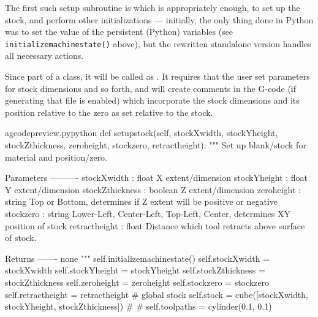 \documentclass{ltxdoc}
\begin{document}
The first such setup subroutine is   which is appropriately enough, to set up the stock, and perform other initializations --- initially, the only thing done in Python was to set the value of the persistent (Python) variables (see \verb|initializemachinestate()| above), but the rewritten standalone version handles all necessary actions.

Since part of a class, it will be called as . It requires that the user set parameters for stock dimensions and so forth, and will create comments in the G-code (if generating that file is enabled) which incorporate the stock dimensions and its position relative to the zero as set relative to the stock.
 
\lstset{firstnumber=\thegcpy}
\begin{writecode}{a}{gcodepreview.py}{python}
    def setupstock(self, stockXwidth, 
                 stockYheight, 
                 stockZthickness, 
                 zeroheight, 
                 stockzero, 
                 retractheight):
        """
        Set up blank/stock for material and position/zero.
        
        Parameters
        ----------
        stockXwidth :   float
                        X extent/dimension
        stockYheight :  float
                        Y extent/dimension
        stockZthickness : boolean
                        Z extent/dimension
        zeroheight :    string
                        Top or Bottom, determines if Z extent will be positive or negative
        stockzero :     string
                        Lower-Left, Center-Left, Top-Left, Center, determines XY position of stock 
        retractheight : float
                        Distance which tool retracts above surface of stock.
        
        Returns
        -------
        none
        """
        self.initializemachinestate() 
        self.stockXwidth = stockXwidth
        self.stockYheight = stockYheight
        self.stockZthickness = stockZthickness
        self.zeroheight = zeroheight
        self.stockzero = stockzero
        self.retractheight = retractheight 
#        global stock
        self.stock = cube([stockXwidth, stockYheight, stockZthickness])
#%
#%
        self.toolpaths = cylinder(0.1, 0.1)
\end{writecode}
\addtocounter{gcpy}{40}
\end{document}
